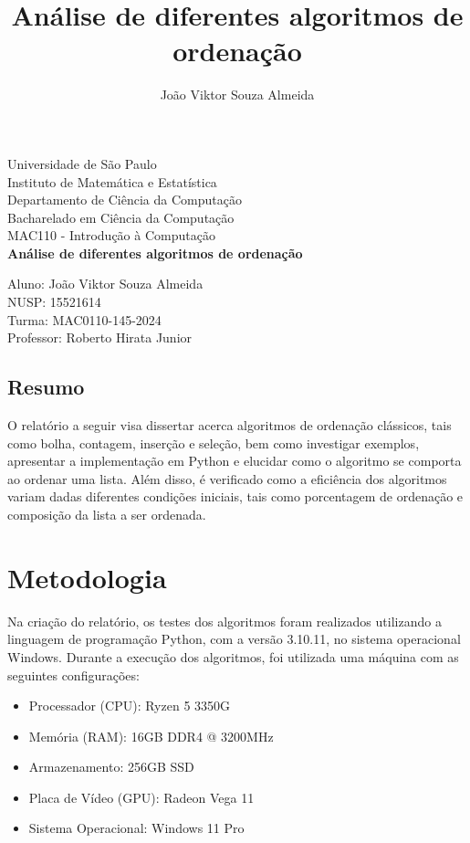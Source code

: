 \documentclass[10pt,a4paper]{article}
\author{João Viktor Souza Almeida}
\title{Análise de diferentes algoritmos de ordenação}
\begin{document}
\begin{titlepage} %
    \begin{center} %
    {\large Universidade de São Paulo}\\[0.2cm] %
    {\large Instituto de Matemática e Estatística}\\[0.2cm] %
    {\large Departamento de Ciência da Computação}\\[0.2cm]
    {\large Bacharelado em Ciência da Computação}\\[0.2cm]
    {\large MAC110 - Introdução à Computação}\\[5.1cm]
    {\bf \huge Análise de diferentes algoritmos de ordenação}\\[5.1cm] 
    \end{center} %
    {\large Aluno: João Viktor Souza Almeida}\\[0.7cm] %
    {\large NUSP: 15521614}\\[0.7cm] %
    {\large Turma: MAC0110-145-2024}\\[0.7cm] %
    {\large Professor: Roberto Hirata Junior}\\[5.1cm]
    \end{titlepage} %

\subsection*{Resumo}
O relatório a seguir visa dissertar acerca algoritmos de ordenação clássicos, tais como bolha, contagem, inserção e seleção, bem como investigar exemplos, apresentar a implementação em Python e elucidar como o algoritmo se comporta ao ordenar uma lista.
Além disso, é verificado como a eficiência dos algoritmos variam dadas diferentes condições iniciais, tais como porcentagem de ordenação e composição da lista a ser ordenada. 
\
\section*{Metodologia}
Na criação do relatório, os testes dos algoritmos foram realizados utilizando a linguagem de programação Python, com a versão 3.10.11, no sistema operacional Windows. Durante a execução dos algoritmos, foi utilizada uma máquina com as seguintes configurações:
\begin{itemize}
\item    Processador (CPU): Ryzen 5 3350G 
\item Memória (RAM): 16GB DDR4 @ 3200MHz
\item Armazenamento: 256GB SSD
\item Placa de Vídeo (GPU): Radeon Vega 11
\item Sistema Operacional: Windows 11 Pro
\end{itemize}
\end{document}
